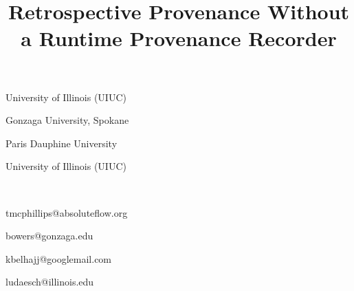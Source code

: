 \documentclass[nocopyrightspace]{sigplanconf}
\begin{document}
\title{Retrospective Provenance Without a Runtime Provenance Recorder}

{
  \begin{minipage}{1.0\linewidth}
    \begin{minipage}{0.24\linewidth} \centering
      University of Illinois (UIUC)
    \end{minipage}
    \begin{minipage}{0.24\linewidth} \centering
      Gonzaga University, Spokane
    \end{minipage}
    \begin{minipage}{0.24\linewidth} \centering
      Paris Dauphine University 
    \end{minipage}
    \begin{minipage}{0.24\linewidth} \centering
      University of Illinois (UIUC)
    \end{minipage}    
  \end{minipage}
}
{
$\,$\\
  \vspace{-4mm}
  \begin{minipage}{1.0\linewidth}
    \begin{minipage}{0.24\linewidth} \centering
      tmcphillips@absoluteflow.org
    \end{minipage}
    \begin{minipage}{0.24\linewidth} \centering
      bowers@gonzaga.edu
    \end{minipage}
    \begin{minipage}{0.24\linewidth} \centering
      kbelhajj@googlemail.com
    \end{minipage}
    \begin{minipage}{0.24\linewidth} \centering
      ludaesch@illinois.edu
    \end{minipage}
  \end{minipage}
}
\end{document}
